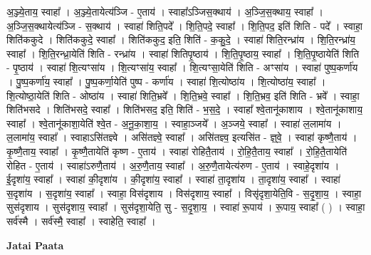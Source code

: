 \documentclass[17pt]{extarticle}
\begin{document}
अ॒ञ्ज्ये॒ताय॒ स्वाहा᳚ । अ॒ञ्ज्ये॒तायेत्य॑ञ्जि - ए॒ताय॑ । स्वाहा᳚ऽञ्जिस॒क्थाय॑ । अ॒ञ्जि॒स॒क्थाय॒ स्वाहा᳚ । अ॒ञ्जि॒स॒क्थायेत्य॑ञ्जि - स॒क्थाय॑ । स्वाहा॑ शिति॒पदे᳚ । शि॒ति॒पदे॒ स्वाहा᳚ । शि॒ति॒पद॒ इति॑ शिति - पदे᳚ । स्वाहा॒ शिति॑ककुदे । शिति॑ककुदे॒ स्वाहा᳚ । शिति॑ककुद॒ इति॒ शिति॑ - क॒कु॒दे॒ । स्वाहा॑ शिति॒रन्ध्रा॑य । शि॒ति॒रन्ध्रा॑य॒ स्वाहा᳚ । शि॒ति॒रन्ध्रा॒येति॑ शिति - रन्ध्रा॑य । स्वाहा॑ शितिपृ॒ष्ठाय॑ । शि॒ति॒पृ॒ष्ठाय॒ स्वाहा᳚ । शि॒ति॒पृ॒ष्ठायेति॑ शिति - पृ॒ष्ठाय॑ । स्वाहा॑ शि॒त्यꣳसा॑य । शि॒त्यꣳसा॑य॒ स्वाहा᳚ । शि॒त्यꣳसा॒येति॑ शिति - अꣳसा॑य । स्वाहा॑ पुष्प॒कर्णा॑य । पु॒ष्प॒कर्णा॑य॒ स्वाहा᳚ । पु॒ष्प॒कर्णा॒येति॑ पुष्प - कर्णा॑य । स्वाहा॑ शि॒त्योष्ठा॑य । शि॒त्योष्ठा॑य॒ स्वाहा᳚ । शि॒त्योष्ठा॒येति॑ शिति - ओष्ठा॑य । स्वाहा॑ शिति॒भ्रवे᳚ । शि॒ति॒भ्रवे॒ स्वाहा᳚ । शि॒ति॒भ्रव॒ इति॑ शिति - भ्रवे᳚ । स्वाहा॒ शिति॑भसदे । शिति॑भसदे॒ स्वाहा᳚ । शिति॑भसद॒ इति॒ शिति॑ - भ॒स॒दे॒ । स्वाहा᳚ श्वे॒तानू॑काशाय । श्वे॒तानू॑काशाय॒ स्वाहा᳚ । श्वे॒तानू॑काशा॒येति॑ श्वे॒त - अ॒नू॒का॒शा॒य॒ । स्वाहा॒ञ्जये᳚ । अ॒ञ्जये॒ स्वाहा᳚ । स्वाहा॑ ल॒लामा॑य । ल॒लामा॑य॒ स्वाहा᳚ । स्वाहाऽसि॑तज्ञ्वे । असि॑तज्ञ्वे॒ स्वाहा᳚ । असि॑तज्ञ्व॒ इत्यसि॑त - ज्ञ्॒वे॒ । स्वाहा॑ कृष्णै॒ताय॑ । कृ॒ष्णै॒ताय॒ स्वाहा᳚ । कृ॒ष्णै॒तायेति॑ कृष्ण - ए॒ताय॑ । स्वाहा॑ रोहितै॒ताय॑ । रो॒हि॒तै॒ताय॒ स्वाहा᳚ । रो॒हि॒तै॒तायेति॑ रोहित - ए॒ताय॑ । स्वाहा॑ऽरुणै॒ताय॑ । अ॒रु॒णै॒ताय॒ स्वाहा᳚ । अ॒रु॒णै॒तायेत्य॑रुण - ए॒ताय॑ । स्वाहे॒दृशा॑य । ई॒दृशा॑य॒ स्वाहा᳚ । स्वाहा॑ की॒दृशा॑य । की॒दृशा॑य॒ स्वाहा᳚ । स्वाहा॑ ता॒दृशा॑य । ता॒दृशा॑य॒ स्वाहा᳚ । स्वाहा॑ स॒दृशा॑य । स॒दृशा॑य॒ स्वाहा᳚ । स्वाहा॒ विस॑दृशाय । विस॑दृशाय॒ स्वाहा᳚ । विसृ॑दृशा॒येति॒वि - स॒दृ॒शा॒य॒ । स्वाहा॒ सुस॑दृशाय । सुस॑दृशाय॒ स्वाहा᳚ । सुस॑दृशा॒येति॒ सु - स॒दृ॒शा॒य॒ । स्वाहा॑ रू॒पाय॑ । रू॒पाय॒ स्वाहा᳚ ( ) । स्वाहा॒ सर्व॑स्मै । सर्व॑स्मै॒ स्वाहा᳚ । 
स्वाहेति॒ स्वाहा᳚ । \newline

\textbf{Jatai Paata} \newline
\end{document}
